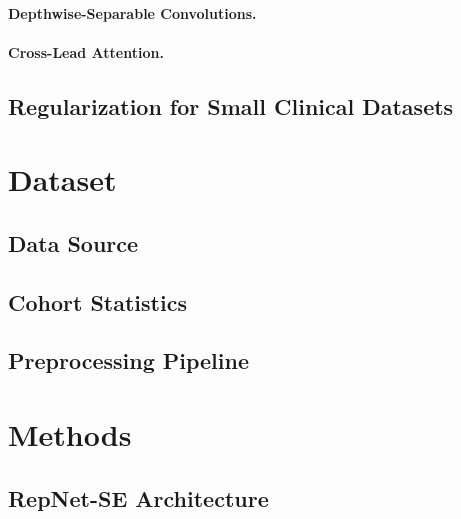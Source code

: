\documentclass[sigconf,nonacm]{acmart}
\begin{document}
\paragraph{Depthwise-Separable Convolutions.}

\paragraph{Cross-Lead Attention.}

\subsection{Regularization for Small Clinical Datasets}


\section{Dataset}
\label{sec:dataset}

\subsection{Data Source}

\subsection{Cohort Statistics}

\subsection{Preprocessing Pipeline}


\section{Methods}
\label{sec:methods}

\subsection{RepNet-SE Architecture}
\label{sec:arch}
\end{document}
